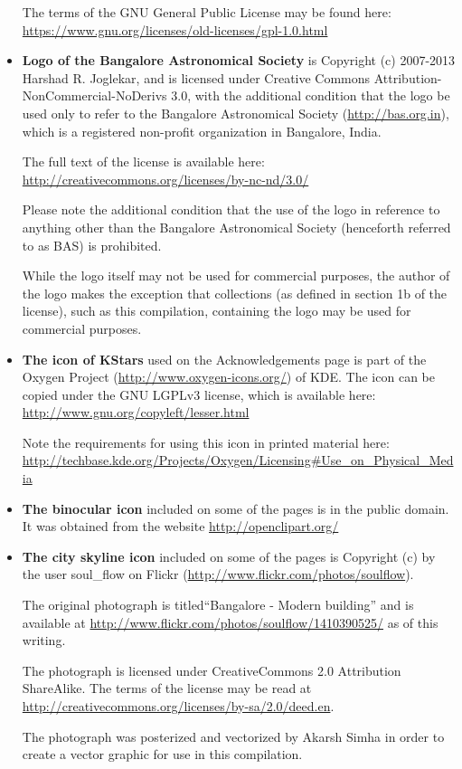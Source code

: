 \begin{itemize}
  The terms of the GNU General Public License may be found here:
  \url{https://www.gnu.org/licenses/old-licenses/gpl-1.0.html}

\item \textbf{Logo of the Bangalore Astronomical Society} is Copyright
  (c) 2007-2013 Harshad R. Joglekar, and is licensed under Creative
  Commons Attribution-NonCommercial-NoDerivs 3.0, with the additional
  condition that the logo be used only to refer to the Bangalore
  Astronomical Society (\url{http://bas.org.in}), which is a
  registered non-profit organization in Bangalore, India. 

  The full text of the license is available here:
  \url{http://creativecommons.org/licenses/by-nc-nd/3.0/}

  Please note the additional condition that the use of the logo in
  reference to anything other than the Bangalore Astronomical Society
  (henceforth referred to as BAS) is prohibited.

  While the logo itself may not be used for commercial purposes, the
  author of the logo makes the exception that collections (as defined
  in section 1b of the license), such as this compilation, containing
  the logo may be used for commercial purposes.

\item \textbf{The icon of KStars} used on the Acknowledgements page is
  part of the Oxygen Project (\url{http://www.oxygen-icons.org/}) of
  KDE. The icon can be copied under the GNU LGPLv3 license, which is
  available here: \url{http://www.gnu.org/copyleft/lesser.html}

  Note the requirements for using this icon in printed material here:
  \url{http://techbase.kde.org/Projects/Oxygen/Licensing#Use_on_Physical_Media}

\item \textbf{The binocular icon} included on some of the pages is in
  the public domain. It was obtained from the website
  \url{http://openclipart.org/}
  
\item \textbf{The city skyline icon} included on some of the pages is
  Copyright (c) by the user soul\_flow on Flickr
  (\url{http://www.flickr.com/photos/soulflow}).

  The original photograph is titled``Bangalore - Modern building'' and
  is available at
  \url{http://www.flickr.com/photos/soulflow/1410390525/} as of this
  writing.

  The photograph is licensed under CreativeCommons 2.0 Attribution
  ShareAlike. The terms of the license may be read at
  \url{http://creativecommons.org/licenses/by-sa/2.0/deed.en}.

  The photograph was posterized and vectorized by Akarsh Simha in
  order to create a vector graphic for use in this compilation.

\end{itemize}

